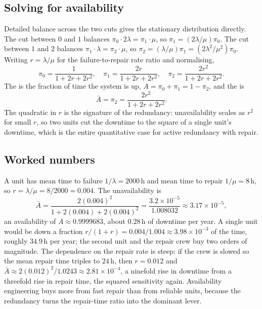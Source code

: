 \subsection{Solving for availability}

Detailed balance across the two cuts gives the stationary distribution
directly. The cut between $0$ and $1$ balances $\pi_{0}\cdot 2\lambda =
\pi_{1}\cdot\mu$, so $\pi_{1} = (2\lambda/\mu)\pi_{0}$. The cut between
$1$ and $2$ balances $\pi_{1}\cdot\lambda = \pi_{2}\cdot\mu$, so
$\pi_{2} = (\lambda/\mu)\pi_{1} = (2\lambda^{2}/\mu^{2})\pi_{0}$.
Writing $r = \lambda/\mu$ for the failure-to-repair rate ratio and
normalising,
\[
\pi_{0} = \frac{1}{1 + 2r + 2r^{2}}, \quad
\pi_{1} = \frac{2r}{1 + 2r + 2r^{2}}, \quad
\pi_{2} = \frac{2r^{2}}{1 + 2r + 2r^{2}}.
\]
The  is the fraction of time the
system is up, $A = \pi_{0} + \pi_{1} = 1 - \pi_{2}$, and the
 is
\[
\bar A = \pi_{2} = \frac{2r^{2}}{1 + 2r + 2r^{2}}.
\]
The quadratic in $r$ is the signature of the redundancy: unavailability
scales as $r^{2}$ for small $r$, so two units cut the downtime to the
square of a single unit's downtime, which is the entire quantitative
case for active redundancy with repair.

\subsection{Worked numbers}

A unit has mean time to failure $1/\lambda = 2000\,\text{h}$ and mean
time to repair $1/\mu = 8\,\text{h}$, so $r = \lambda/\mu = 8/2000 =
0.004$. The unavailability is
\[
\bar A = \frac{2(0.004)^{2}}{1 + 2(0.004) + 2(0.004)^{2}}
= \frac{3.2 \times 10^{-5}}{1.008032}
\approx 3.17 \times 10^{-5},
\]
an availability of $A \approx 0.9999683$, about $0.28\,\text{h}$ of
downtime per year. A single unit would be down a fraction $r/(1 + r) =
0.004/1.004 \approx 3.98 \times 10^{-3}$ of the time, roughly
$34.9\,\text{h}$ per year; the second unit and the repair crew buy two
orders of magnitude. The dependence on the repair rate is steep: if the
crew is slowed so the mean repair time triples to $24\,\text{h}$, then
$r = 0.012$ and $\bar A \approx 2(0.012)^{2}/1.0243 \approx 2.81 \times
10^{-4}$, a ninefold rise in downtime from a threefold rise in repair
time, the squared sensitivity again. Availability engineering buys more
from fast repair than from reliable units, because the redundancy turns
the repair-time ratio into the dominant lever.

